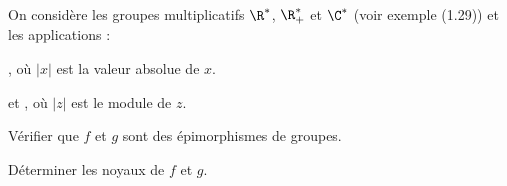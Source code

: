 On considère les groupes multiplicatifs $\R^\ast$, $\R^\ast_+$ et $\C^\ast$ (voir exemple (1.29)) et les applications :

, où $|x|$ est la valeur absolue de $x$.

et , où $|z|$ est le module de $z$.

Vérifier que $f$ et $g$ sont des épimorphismes de groupes.

Déterminer les noyaux de $f$ et $g$.